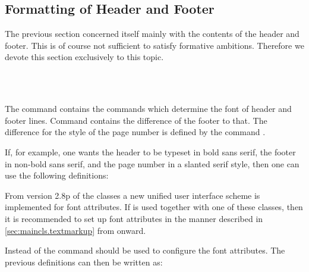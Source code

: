\subsection{Formatting of Header and Footer}
\label{sec:scrpage.basics.format}
The previous section concerned itself mainly with the contents of the
header and footer. This is of course not sufficient to satisfy
formative ambitions. Therefore we devote this section exclusively to
this topic.

\begin{Declaration}
  \\
  \\
\end{Declaration}%
%
%
%
The command  contains the commands which determine the font of
header and footer lines.  Command  contains the difference of
the footer to that. The difference for the style of the page number is defined
by the command .
\begin{Example}
  If, for example, one wants the header to be typeset in bold sans serif, the
  footer in non-bold sans serif, and the page number in a slanted serif style,
  then one can use the following definitions:
\begin{lstcode}
  \renewcommand{\headfont}{\normalfont\sffamily\bfseries}
  \renewcommand*{\footfont}{\normalfont\sffamily}
  \renewcommand{\pnumfont}{\normalfont\rmfamily\slshape}
\end{lstcode}
\end{Example}
%
%
%

%
%
%
From version 2.8p of the {\KOMAScript} classes a new unified user interface
scheme is implemented for font attributes. If  is used
together with one of these classes, then it is recommended to set up font
attributes in the manner described in \autoref{sec:maincls.textmarkup} from
 onward.
\begin{Example}
  Instead of  the command 
  should be used to configure the font attributes. The previous
  definitions can then be written as:
\begin{lstcode}
  \normalfont\sffamily\bfseries}
  \setkomafont{pagefoot}{\normalfont\sffamily}
  \setkomafont{pagenumber}{\normalfont\rmfamily\slshape}
\end{lstcode}
\end{Example}
%
%
%


